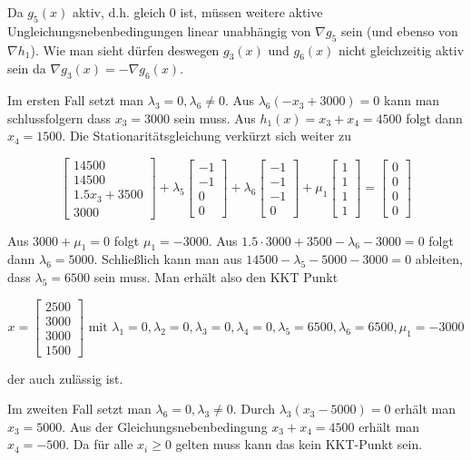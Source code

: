 \documentclass[a4paper, 12pt]{report}
\begin{document}
Da $g_5(x)$ aktiv, d.h. gleich $0$ ist, müssen weitere aktive Ungleichungsnebenbedingungen linear unabhängig von $\nabla g_5$ sein (und ebenso von $\nabla h_1$).
Wie man sieht dürfen deswegen $g_3(x)$ und $g_6(x)$ nicht gleichzeitig aktiv sein da $\nabla g_3(x) = -\nabla g_6(x)$.\par



Im ersten Fall setzt man $\lambda_3 = 0, \lambda_6 \neq 0$. Aus $\lambda_6(-x_3 + 3000) = 0$ kann man schlussfolgern dass $x_3 = 3000$
sein muss. Aus $h_1(x) = x_3 + x_4 = 4500$ folgt dann $x_4 = 1500$. Die Stationaritätsgleichung verkürzt sich weiter zu

$$ \begin{bmatrix}14500\\14500\\1.5x_3 + 3500\\3000\end{bmatrix} + \lambda_5 \begin{bmatrix}-1\\-1\\0\\0\end{bmatrix} + \lambda_6 \begin{bmatrix} -1\\-1\\-1\\0 \end{bmatrix} + \mu_1 \begin{bmatrix}1\\1\\1\\1\end{bmatrix} = \begin{bmatrix}0\\0\\0\\0\end{bmatrix} $$

Aus $3000 + \mu_1 = 0$ folgt $\mu_1 = -3000$. Aus $1.5 \cdot 3000 + 3500 - \lambda_6 - 3000 = 0$ folgt dann $\lambda_6 = 5000$.
Schließlich kann man aus $14500 - \lambda_5 - 5000 - 3000 = 0$ ableiten, dass $\lambda_5 = 6500$ sein muss. Man erhält also
den KKT Punkt

$$ x = \begin{bmatrix}2500\\3000\\3000\\1500\end{bmatrix} \text{ mit } \lambda_1 = 0, \lambda_2 = 0, \lambda_3 = 0, \lambda_4 = 0, \lambda_5 = 6500, \lambda_6 = 6500, \mu_1 = -3000$$

der auch zulässig ist.\par


Im zweiten Fall setzt man $\lambda_6 = 0, \lambda_3 \neq 0$. Durch $\lambda_3(x_3 - 5000) = 0$ erhält man $x_3 = 5000$. Aus der
Gleichungsnebenbedingung $x_3 + x_4 = 4500$ erhält man $x_4 = -500$. Da für alle $x_i \geq 0$ gelten muss kann das kein KKT-Punkt
sein.
\end{document}
